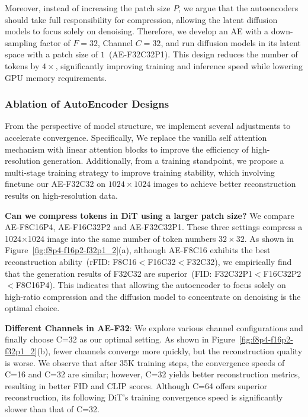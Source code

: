 Moreover, instead of increasing the patch size $P$, we argue that the autoencoders should take full responsibility for compression, allowing the latent diffusion models to focus solely on denoising. Therefore, we develop an AE with a down-sampling factor of $F=32$, Channel $C=32$, and run diffusion models in its latent space with a patch size of $1$~(AE-F32C32P1). This design reduces the number of tokens by $4\times$, significantly improving training and inference speed while lowering GPU memory requirements. 

\subsubsection{Ablation of AutoEncoder Designs}
From the perspective of model structure, we implement several adjustments to accelerate convergence. Specifically, We replace the vanilla self attention mechanism with linear attention blocks to improve the efficiency of high-resolution generation. Additionally, from a training standpoint, we propose a multi-stage training strategy to improve training stability, which involving finetune our AE-F32C32 on $1024\times 1024$ images to achieve better reconstruction results on high-resolution data.





\noindent\textbf{Can we compress tokens in DiT using a larger patch size?} We compare AE-F8C16P4, AE-F16C32P2 and AE-F32C32P1. These three settings compress a 1024×1024 image into the same number of token numbers $32\times32$. As shown in Figure~\ref{fig:f8p4-f16p2-f32p1_2}(a), although AE-F8C16 exhibits the best reconstruction ability~(rFID: F8C16$<$F16C32$<$F32C32), we empirically find that the generation results of F32C32 are superior~(FID: F32C32P1$<$F16C32P2$<$F8C16P4). This indicates that allowing the autoencoder to focus solely on high-ratio compression and the diffusion model to concentrate on denoising is the optimal choice.





\noindent\textbf{Different Channels in AE-F32}: We explore various channel configurations and finally choose C=32 as our optimal setting. As shown in Figure~\ref{fig:f8p4-f16p2-f32p1_2}(b), fewer channels converge more quickly, but the reconstruction quality is worse. We observe that after 35K training steps, the convergence speeds of C=16 and C=32 are similar; however, C=32 yields better reconstruction metrics, resulting in better FID and CLIP scores. Although C=64 offers superior reconstruction, its following DiT's training convergence speed is significantly slower than that of C=32.


